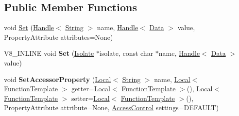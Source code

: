 \subsection*{Public Member Functions}
\begin{DoxyCompactItemize}
\item 
void \hyperlink{classv8_1_1_template_a8a29557db5d0bc980752084b925a9b01}{Set} (\hyperlink{classv8_1_1_handle}{Handle}$<$ \hyperlink{classv8_1_1_string}{String} $>$ name, \hyperlink{classv8_1_1_handle}{Handle}$<$ \hyperlink{classv8_1_1_data}{Data} $>$ value, Property\+Attribute attributes=None)
\item 
\hypertarget{classv8_1_1_template_a92d31ee3f0dc22160bd0964c8aeaeb70}{}V8\+\_\+\+I\+N\+L\+I\+N\+E void {\bfseries Set} (\hyperlink{classv8_1_1_isolate}{Isolate} $\ast$isolate, const char $\ast$name, \hyperlink{classv8_1_1_handle}{Handle}$<$ \hyperlink{classv8_1_1_data}{Data} $>$ value)\label{classv8_1_1_template_a92d31ee3f0dc22160bd0964c8aeaeb70}

\item 
\hypertarget{classv8_1_1_template_a1806da8c927107645490f72780f7da8c}{}void {\bfseries Set\+Accessor\+Property} (\hyperlink{classv8_1_1_local}{Local}$<$ \hyperlink{classv8_1_1_string}{String} $>$ name, \hyperlink{classv8_1_1_local}{Local}$<$ \hyperlink{classv8_1_1_function_template}{Function\+Template} $>$ getter=\hyperlink{classv8_1_1_local}{Local}$<$ \hyperlink{classv8_1_1_function_template}{Function\+Template} $>$(), \hyperlink{classv8_1_1_local}{Local}$<$ \hyperlink{classv8_1_1_function_template}{Function\+Template} $>$ setter=\hyperlink{classv8_1_1_local}{Local}$<$ \hyperlink{classv8_1_1_function_template}{Function\+Template} $>$(), Property\+Attribute attribute=None, \hyperlink{namespacev8_a31d8355cb043d7d2dda3f4a52760b64e}{Access\+Control} settings=D\+E\+F\+A\+U\+L\+T)\label{classv8_1_1_template_a1806da8c927107645490f72780f7da8c}


\end{DoxyCompactItemize}
